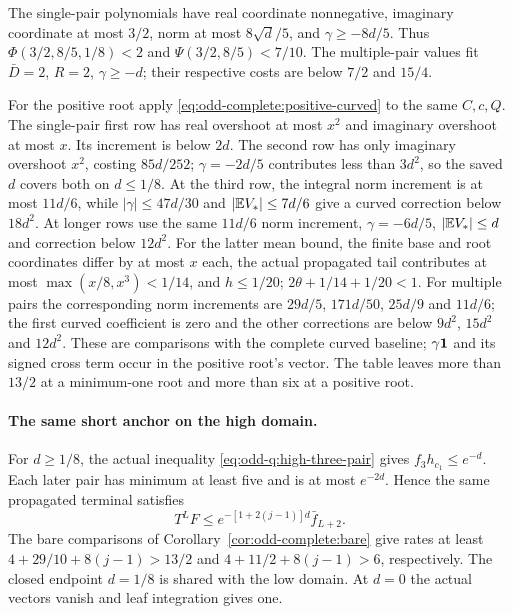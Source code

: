 The single-pair polynomials have real coordinate nonnegative,
imaginary coordinate at most $3/2$, norm at most $8\sqrt d/5$,
and $\gamma\ge-8d/5$. Thus
$\Phi(3/2,8/5,1/8)<2$ and
$\Psi(3/2,8/5)<7/10$. The multiple-pair values fit
$\bar D=2$, $R=2$, $\gamma\ge-d$; their respective costs
are below $7/2$ and $15/4$.

For the positive root apply
\eqref{eq:odd-complete:positive-curved} to the same $C,c,Q$.
The single-pair first row has real overshoot at most $x^2$ and
imaginary overshoot at most $x$. Its increment is below $2d$.
The second row has only imaginary overshoot $x^2$, costing
$85d/252$; $\gamma=-2d/5$ contributes less than $3d^2$,
so the saved $d$ covers both on $d\le1/8$.
At the third row, the integral norm increment is at most
$11d/6$, while $|\gamma|\le47d/30$ and
$|\mathbb E V_*|\le7d/6$ give a curved correction below $18d^2$.
At longer rows use the same $11d/6$ norm increment,
$\gamma=-6d/5$, $|\mathbb E V_*|\le d$ and correction below
$12d^2$. For the latter mean bound, the finite base and root
coordinates differ by at most $x$ each, the actual propagated
tail contributes at most $\max(x/8,x^3)<1/14$, and $h\le1/20$;
$2\theta+1/14+1/20<1$.
For multiple pairs the corresponding norm increments
are $29d/5$, $171d/50$, $25d/9$ and $11d/6$;
the first curved coefficient is zero and the other corrections
are below $9d^2$, $15d^2$ and $12d^2$.
These are comparisons with the complete curved baseline;
$\gamma\mathbf1$ and its signed cross term occur in the positive
root's vector. The table leaves more than $13/2$ at a
minimum-one root and more than six at a positive root.

\paragraph{The same short anchor on the high domain.}
For $d\ge1/8$, the actual inequality
\eqref{eq:odd-q:high-three-pair} gives $f_3h_{c_1}\le e^{-d}$.
Each later pair has minimum at least five and is at most
$e^{-2d}$. Hence the same propagated terminal satisfies
\[
 T^LF\le e^{-[1+2(j-1)]d}\bar f_{L+2}.
\]
The bare comparisons of Corollary~\ref{cor:odd-complete:bare}
give rates at least $4+29/10+8(j-1)>13/2$ and
$4+11/2+8(j-1)>6$, respectively.
The closed endpoint $d=1/8$ is shared with the low domain.
At $d=0$ the actual vectors vanish and leaf integration gives one.
